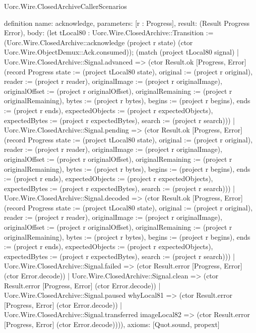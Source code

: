 \begin{lexlean}{Uorc.Wire.ClosedArchiveCallerScenarios}
\begin{semanticmodule}
definition{
  name: acknowledge,
  parameters: [r : Progress],
  result: (Result Progress Error),
  body: (let tLocal80 : Uorc.Wire.ClosedArchive::Transition := (Uorc.Wire.ClosedArchive::acknowledge (project r state) (ctor Uorc.Wire.ObjectDemux::Ack.consumed)); (match (project tLocal80 signal)
    | Uorc.Wire.ClosedArchive::Signal.advanced => (ctor Result.ok [Progress, Error] (record Progress {state := (project tLocal80 state), original := (project r original), reader := (project r reader), originalImage := (project r originalImage), originalOffset := (project r originalOffset), originalRemaining := (project r originalRemaining), bytes := (project r bytes), begins := (project r begins), ends := (project r ends), expectedObjects := (project r expectedObjects), expectedBytes := (project r expectedBytes), search := (project r search)}))
    | Uorc.Wire.ClosedArchive::Signal.pending => (ctor Result.ok [Progress, Error] (record Progress {state := (project tLocal80 state), original := (project r original), reader := (project r reader), originalImage := (project r originalImage), originalOffset := (project r originalOffset), originalRemaining := (project r originalRemaining), bytes := (project r bytes), begins := (project r begins), ends := (project r ends), expectedObjects := (project r expectedObjects), expectedBytes := (project r expectedBytes), search := (project r search)}))
    | Uorc.Wire.ClosedArchive::Signal.decoded => (ctor Result.ok [Progress, Error] (record Progress {state := (project tLocal80 state), original := (project r original), reader := (project r reader), originalImage := (project r originalImage), originalOffset := (project r originalOffset), originalRemaining := (project r originalRemaining), bytes := (project r bytes), begins := (project r begins), ends := (project r ends), expectedObjects := (project r expectedObjects), expectedBytes := (project r expectedBytes), search := (project r search)}))
    | Uorc.Wire.ClosedArchive::Signal.failed => (ctor Result.error [Progress, Error] (ctor Error.decode))
    | Uorc.Wire.ClosedArchive::Signal.clean => (ctor Result.error [Progress, Error] (ctor Error.decode))
    | Uorc.Wire.ClosedArchive::Signal.paused whyLocal81 => (ctor Result.error [Progress, Error] (ctor Error.decode))
    | Uorc.Wire.ClosedArchive::Signal.transferred imageLocal82 => (ctor Result.error [Progress, Error] (ctor Error.decode)))),
  axioms: [Quot.sound, propext]
}


\end{semanticmodule}
\end{lexlean}
